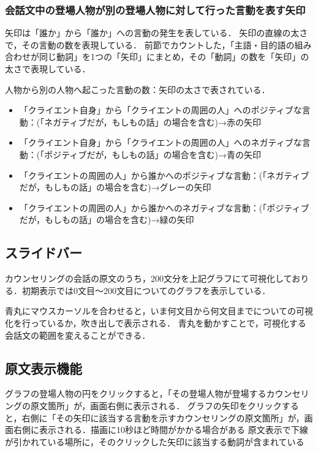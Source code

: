 \documentclass[shuuron]{kuee}
\begin{document}
\subsubsection{会話文中の登場人物が別の登場人物に対して行った言動を表す矢印}

矢印は「誰か」から「誰か」への言動の発生を表している．
矢印の直線の太さで，その言動の数を表現している．
前節でカウントした，「主語・目的語の組み合わせが同じ動詞」を1つの「矢印」にまとめ，その「動詞」の数を「矢印」の太さで表現している．

人物から別の人物へ起こった言動の数：矢印の太さで表されている．


\begin{itemize}
  \item 「クライエント自身」から「クライエントの周囲の人」へのポジティブな言動：(「ネガティブだが，もしもの話」の場合を含む)→赤の矢印
  \item 「クライエント自身」から「クライエントの周囲の人」へのネガティブな言動：(「ポジティブだが，もしもの話」の場合を含む)→青の矢印
  \item 「クライエントの周囲の人」から誰かへのポジティブな言動：(「ネガティブだが，もしもの話」の場合を含む)→グレーの矢印
  \item 「クライエントの周囲の人」から誰かへのネガティブな言動：(「ポジティブだが，もしもの話」の場合を含む)→緑の矢印
\end{itemize}








\subsection{スライドバー}

カウンセリングの会話の原文のうち，200文分を上記グラフにて可視化しておりる．初期表示では0文目〜200文目についてのグラフを表示している．

青丸にマウスカーソルを合わせると，いま何文目から何文目までについての可視化を行っているか，吹き出しで表示される．
青丸を動かすことで，可視化する会話文の範囲を変えることができる．


\subsection{原文表示機能}

グラフの登場人物の円をクリックすると，「その登場人物が登場するカウンセリングの原文箇所」が，画面右側に表示される．
グラフの矢印をクリックすると，右側に「その矢印に該当する言動を示すカウンセリングの原文箇所」が，画面右側に表示される．描画に10秒ほど時間がかかる場合がある
原文表示で下線が引かれている場所に，そのクリックした矢印に該当する動詞が含まれている
\end{document}
